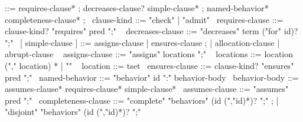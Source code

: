 \begin{syntax}
   ::= requires-clause* ;
                            { decreases-clause? } simple-clause* ;
                            named-behavior* completeness-clause* ;
  \
  clause-kind ::= "check" | "admit"
  \
  requires-clause ::= clause-kind? "requires" pred ";"
  \
  { decreases-clause } ::= { "decreases" term ("for" id)? ";" }
  \
  [ simple-clause ] ::= { assigns-clause } | ensures-clause ;
                        | { allocation-clause} | { abrupt-clause }
  \
  { assigns-clause } ::= { "assigns" locations ";" }
  \
  { locations } ::= { location ("," location) * | "\nothing" }
  \
  { location } ::= { tset }
  \
  ensures-clause ::= clause-kind? "ensures" pred ";"
  \
  named-behavior ::= "behavior" id ":" behavior-body
  \
  behavior-body ::= assumes-clause* requires-clause* simple-clause*
  \
  assumes-clause ::= "assumes" pred ";"
  \
  completeness-clause ::= "complete" "behaviors" (id (","id)*)? ";" ;
                        | "disjoint" "behaviors" (id (","id)*)? ";"
\end{syntax}
